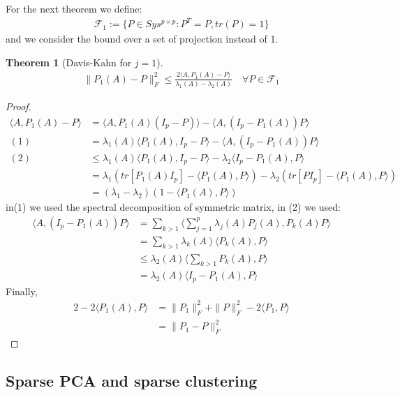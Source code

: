 \documentclass[a4paper,12pt, oneside, fleqn]{book}
\newtheorem{theorem}{Theorem}[section]
\theoremstyle{definition}
\theoremstyle{remark}
\begin{document}
For the next theorem we define:
\begin{align*}
	\mathcal{F}_1:= \{P \in Sys^{p \times p}: P^T = P, tr(P) = 1\}
\end{align*}
and we consider the bound over a set of projection instead of 1.
\begin{theorem}[Davis-Kahn for $j = 1$]
\begin{align*}
	\|P_1(A) - P\|_F^2 \le \frac{2\langle A, P_1(A) - P \rangle}{\lambda_1(A) - \lambda_2(A)}
	\quad \forall P \in \mathcal{F}_1
\end{align*}
\end{theorem}
\begin{proof}
	\begin{align*}
		\langle A, P_1(A) - P\rangle &= \langle A, P_1(A)(I_p - P) \rangle - \langle A, (I_p - P_1(A))P \rangle\\
	(1)	&= \lambda_1(A)\langle P_1(A), I_p- P\rangle - \langle A, (I_p - P_1(A))P \rangle \\
	(2)	&\le \lambda_1(A)\langle P_1(A), I_p- P\rangle - \lambda_2\langle I_p - P_1(A), P\rangle\\
	&= \lambda_1 (tr[P_1(A)I_p] - \langle P_1(A), P\rangle) - \lambda_2(tr[PI_p]- \langle P_1(A), P\rangle)\\
	&= (\lambda_1 - \lambda_2 )(1- \langle P_1(A) , P\rangle)
	\end{align*}
	in(1) we used the spectral decomposition of symmetric matrix,  in (2) we used:
	\begin{align*}
		\langle A, (I_p - P_1(A))P \rangle &= \sum_{k >1}\langle \sum_{j = 1}^p \lambda_j(A)P_j(A), P_k(A) P\rangle\\ 
		&= \sum_{k >1}\lambda_k(A)\langle P_k(A), P\rangle\\
		&\le \lambda_2(A) \langle\sum_{k >1}P_k(A), P\rangle\\
		&= \lambda_2(A)\langle I_p - P_1(A), P\rangle
	\end{align*}
	Finally, 
	\begin{align*}
		2 - 2\langle P_1(A), P\rangle &= \|P_1\|_F^2 + \|P\|_F^2 - 2\langle P_1, P \rangle\\
		&= \|P_1 - P\|_F^2
	\end{align*}
\end{proof}




\subsection{Sparse PCA and sparse clustering}
\end{document}
